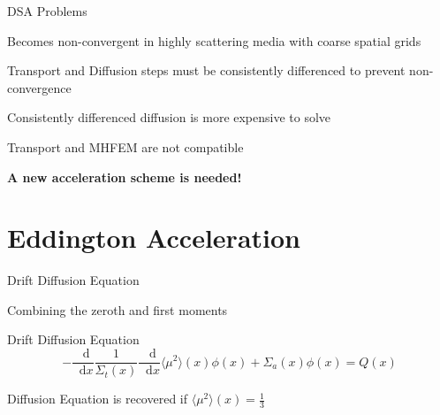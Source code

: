 \documentclass[10pt]{beamer}
\newcommand{\ud}{\mathop{}\!\mathrm{d}} %
\newcommand{\dderiv}[2]{\frac{\ud #1}{\ud #2}}
\newcommand{\edd}{\langle \mu^2 \rangle}
\begin{document}
\begin{frame}{DSA Problems}

    Becomes non-convergent in highly scattering media with coarse spatial grids 

    Transport and Diffusion steps must be consistently differenced to prevent non-convergence 

    Consistently differenced diffusion is more expensive to solve 

    Transport and MHFEM are not compatible

    \vfill 
    \centerline{\textbf{A new acceleration scheme is needed!}}

\end{frame}

\section{Eddington Acceleration}









\begin{frame}{Drift Diffusion Equation}

	Combining the zeroth and first moments 

    \begin{alertblock}{Drift Diffusion Equation}
	\begin{equation*}
		-\dderiv{}{x} \frac{1}{\Sigma_t(x)} \dderiv{}{x} \edd(x) \phi(x) + \Sigma_a(x) \phi(x) = Q(x) 
	\end{equation*}
    \end{alertblock}

	Diffusion Equation is recovered if $\edd(x) = \frac{1}{3}$
	
\end{frame}
\end{document}
